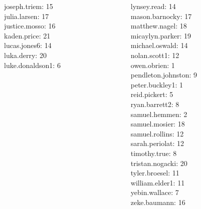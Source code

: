 \documentclass[10pt]{beamer}
\begin{document}
\begin{frame}
\begin{columns}
\begin{column}{0.33\textwidth}
joseph.triem: 15 \\ 
julia.larsen: 17 \\ 
justice.mosso: 16 \\ 
kaden.price: 21 \\ 
lucas.jones6: 14 \\ 
luka.derry: 20 \\ 
luke.donaldson1: 6 \\\end{column}
\begin{column}{0.33\textwidth}
lynsey.read: 14 \\ 
mason.barnocky: 17 \\ 
matthew.nagel: 18 \\ 
micaylyn.parker: 19 \\ 
michael.oswald: 14 \\ 
nolan.scott1: 12 \\ 
owen.obrien: 1 \\ 
pendleton.johnston: 9 \\ 
peter.buckley1: 1 \\ 
reid.pickert: 5 \\ 
ryan.barrett2: 8 \\ 
samuel.hemmen: 2 \\ 
samuel.mosier: 18 \\ 
samuel.rollins: 12 \\ 
sarah.periolat: 12 \\ 
timothy.true: 8 \\ 
tristan.nogacki: 20 \\ 
tyler.broesel: 11 \\ 
william.elder1: 11 \\ 
yebin.wallace: 7 \\ 
zeke.baumann: 16 \\\end{column}
\end{columns}
\vfill
\end{frame}
\end{document}
